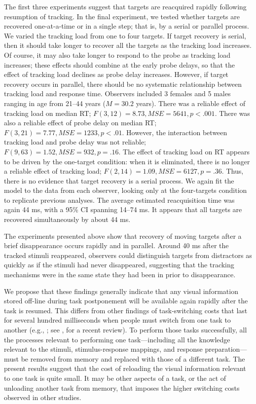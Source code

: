\documentclass[jou,nobf]{apa}
\newcommand{\MSE}{\ensuremath{\mathit{MSE}}}
\begin{document}
The first three experiments suggest that targets are reacquired rapidly
following resumption of tracking.  In the final experiment, we tested
whether targets are recovered one-at-a-time or in a single step; that is,
by a serial or parallel process.  We varied the tracking load from one to
four targets.  If target recovery is serial, then it should take longer to
recover all the targets as the tracking load increases.  Of course, it may
also take longer to respond to the probe as tracking load increases; these
effects should combine at the early probe delays, so that the effect of
tracking load declines as probe delay increases. However, if target
recovery occurs in parallel, there should be no systematic relationship
between tracking load and response time.  Observers included 3 females and
5 males ranging in age from 21--44 years ($M = 30.2$ years).  There was a
reliable effect of tracking load on median RT; $F(3, 12) = 8.73, \MSE =
5641, p < .001$.  There was also a reliable effect of probe delay on median
RT; $F(3, 21) = 7.77, \MSE = 1233, p < .01$.  However, the interaction
between tracking load and probe delay was not reliable; $F(9, 63) = 1.52,
\MSE = 932, p = .16$.  The effect of tracking load on RT appears to be
driven by the one-target condition: when it is eliminated, there is no
longer a reliable effect of tracking load; $F(2, 14) = 1.09, \MSE = 6127, p
= .36$.  Thus, there is no evidence that target recovery is a serial
process.  We again fit the model to the data from each observer, looking
only at the four-targets condition to replicate previous analyses.  The
average estimated reacquisition time was again 44 ms, with a 95\% CI
spanning 14--74 ms.  It appears that all targets are recovered
simultaneously by about 44 ms.

The experiments presented above show that recovery of moving targets after
a brief disappearance occurs rapidly and in parallel.  Around 40 ms after
the tracked stimuli reappeared, observers could distinguish targets from
distractors as quickly as if the stimuli had never disappeared, suggesting
that the tracking mechanisms were in the same state they had been in prior
to disappearance.

We propose that these findings generally indicate that any visual
information stored off-line during task postponement will be available
again rapidly after the task is resumed.  This differs from other findings
of task-switching costs that last for several hundred milliseconds when
people must switch from one task to another (e.g.,
; see
, for a recent review).  To perform those tasks
successfully, all the processes relevant to performing one task---including
all the knowledge relevant to the stimuli, stimulus-response mappings, and
response preparation---must be removed from memory and replaced with those
of a different task.  The present results suggest that the cost of
reloading the visual information relevant to one task is quite small.  It
may be other aspects of a task, or the act of unloading another task from
memory, that imposes the higher switching costs observed in other studies.


\end{document}
